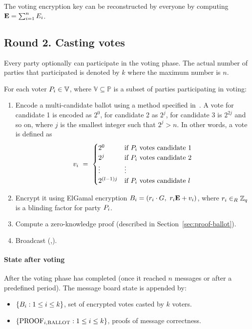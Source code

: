 \documentclass{article}
\begin{document}
The voting encryption key \EncryptionKey{} can be reconstructed by everyone by computing $\textbf{E}=\sum_{i=1}^{n} E_{i}$.


\subsection{Round 2. Casting votes}

Every party optionally can participate in the voting phase. The actual number of parties that participated is denoted by $k$ where the maximum number is $n$.

For each voter $P_{i} \in \mathbb{V}$, where $\mathbb{V} \subseteq  \mathbb{P}$ is a subset of parties participating in voting:


\begin{enumerate}
    \item Encode a multi-candidate ballot using a method specified in~\cite{baudronPracticalMulticandidateElection2001}. A vote for candidate 1 is encoded as $2^0$, for candidate 2 as $2^j$, for candidate 3 is $2^{2j}$ and so on, where $j$ is the smallest integer such that $2^j > n$. In other words, a vote is defined as \[v_{i}\ =\ \begin{cases} 2^0 & \text{if } P_i \text{ votes candidate 1} \\ 2^j & \text{if } P_i \text{ votes candidate 2} \\ \vdots & \vdots \\ 2^{(l-1)j} & \text{if } P_i \text{ votes candidate $l$}\end{cases}\]
    
    \item Encrypt it using ElGamal encryption $\Ballot{i} = (\BlindingFactor{i} \cdot \G,\ \BlindingFactor{i} \EncryptionKey{} + \Vote{i})$, where $r_{i} \in_{R} \mathbb{Z}_q$ is a blinding factor for party $P_{i}$.
    
    \item Compute a zero-knowledge proof (described in Section~\ref{sec:proof-ballot}).
    \item Broadcast (,).
\end{enumerate}

\paragraph{State after voting}

After the voting phase has completed (once it reached $n$ messages or after a predefined period). The message board state is appended by:
\begin{itemize}
    \item $\{B_{i} : 1 \leq i \leq k\}$, set of encrypted votes casted by $k$ voters.
    \item $\{\textrm{PROOF}_{i,\textrm{BALLOT}} : 1 \leq i \leq k\}$, proofs of message correctness.
\end{itemize}
\end{document}
